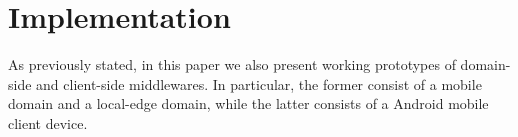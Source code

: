 \section{Implementation}\label{sec:implementation}

As previously stated, in this paper we also present working prototypes of domain-side and client-side middlewares. In particular, the former consist of a mobile domain and a local-edge domain, while the latter consists of a Android mobile client device. 


